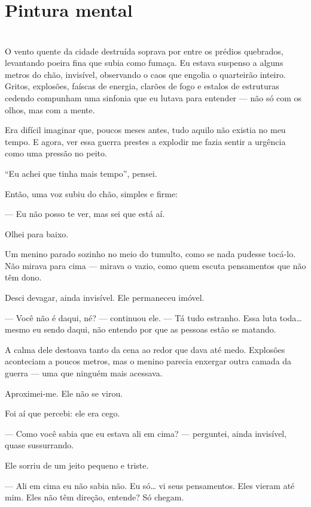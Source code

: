 \newpage

\ifdefined\useChapters
\chapter{Pintura mental}
\else
\chapter{}
\fi

O vento quente da cidade destruída soprava por entre os prédios quebrados, levantando poeira fina que subia como fumaça. Eu estava suspenso a alguns metros do chão, invisível, observando o caos que engolia o quarteirão inteiro. Gritos, explosões, faíscas de energia, clarões de fogo e estalos de estruturas cedendo compunham uma sinfonia que eu lutava para entender — não só com os olhos, mas com a mente.

Era difícil imaginar que, poucos meses antes, tudo aquilo não existia no meu tempo.  
E agora, ver essa guerra prestes a explodir me fazia sentir a urgência como uma pressão no peito.

“Eu achei que tinha mais tempo”, pensei.

Então, uma voz subiu do chão, simples e firme:

— Eu não posso te ver, mas sei que está aí.

Olhei para baixo.

Um menino parado sozinho no meio do tumulto, como se nada pudesse tocá-lo.  
Não mirava para cima — mirava o vazio, como quem escuta pensamentos que não têm dono.

Desci devagar, ainda invisível. Ele permaneceu imóvel.

— Você não é daqui, né? — continuou ele. — Tá tudo estranho. Essa luta toda… mesmo eu sendo daqui, não entendo por que as pessoas estão se matando.

A calma dele destoava tanto da cena ao redor que dava até medo.  
Explosões aconteciam a poucos metros, mas o menino parecia enxergar outra camada da guerra — uma que ninguém mais acessava.

Aproximei-me.  
Ele não se virou.  

Foi aí que percebi:  
ele era cego.

— Como você sabia que eu estava ali em cima? — perguntei, ainda invisível, quase sussurrando.

Ele sorriu de um jeito pequeno e triste.

— Ali em cima eu não sabia não. Eu só… vi seus pensamentos. Eles vieram até mim. Eles não têm direção, entende? Só chegam.

